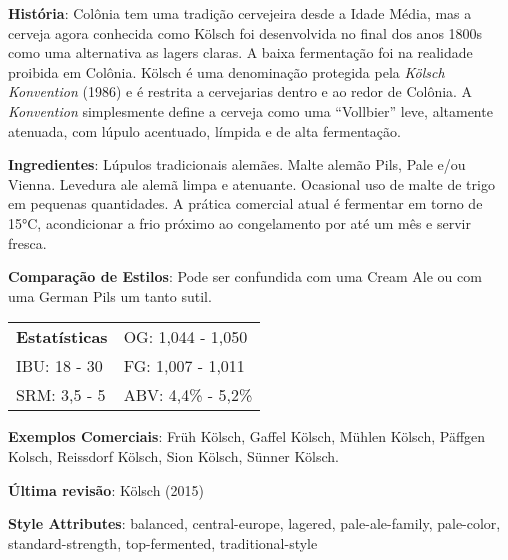 \textbf{História}: Colônia tem uma tradição cervejeira desde a Idade Média, mas a cerveja agora conhecida como Kölsch foi desenvolvida no final dos anos 1800s como uma alternativa as lagers claras. A baixa fermentação foi na realidade proibida em Colônia. Kölsch é uma denominação protegida pela \textit{Kölsch Konvention} (1986) e é restrita a cervejarias dentro e ao redor de Colônia. A \textit{Konvention} simplesmente define a cerveja como uma “Vollbier” leve, altamente atenuada, com lúpulo acentuado, límpida e de alta fermentação.

\textbf{Ingredientes}: Lúpulos tradicionais alemães. Malte alemão Pils, Pale e/ou Vienna. Levedura ale alemã limpa e atenuante. Ocasional uso de malte de trigo em pequenas quantidades. A prática comercial atual é fermentar em torno de 15°C, acondicionar a frio próximo ao congelamento por até um mês e servir fresca.

\textbf{Comparação de Estilos}: Pode ser confundida com uma Cream Ale ou com uma German Pils um tanto sutil.

\begin{tabular}{@{}p{35mm}p{35mm}@{}}
  \textbf{Estatísticas} & OG: 1,044 - 1,050 \\
  IBU: 18 - 30  & FG: 1,007 - 1,011  \\
  SRM: 3,5 - 5  & ABV: 4,4\% - 5,2\%
\end{tabular}

\textbf{Exemplos Comerciais}: Früh Kölsch, Gaffel Kölsch, Mühlen Kölsch, Päffgen Kolsch, Reissdorf Kölsch, Sion Kölsch, Sünner Kölsch.

\textbf{Última revisão}: Kölsch (2015)

\textbf{Style Attributes}: balanced, central-europe, lagered, pale-ale-family, pale-color, standard-strength, top-fermented, traditional-style

